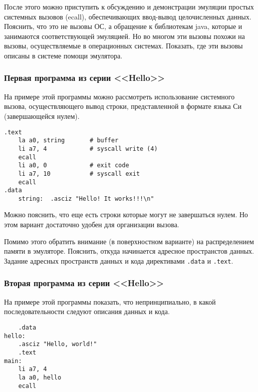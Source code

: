
После этого можно приступить к обсуждению и демонстрации эмуляции простых системных вызовов (ecall), обеспечивающих ввод-вывод целочисленных данных. Пояснить, что это не вызовы ОС, а обращение к библиотекам java, которые и занимаются соответствующей эмуляцией. Но во многом эти вызовы похожи на вызовы, осуществляемые в операционных системах. Показать, где эти вызовы описаны в системе помощи эмулятора.

\subsubsection{Первая программа из серии <<Hello>>}
На примере этой программы можно рассмотреть использование системного вызова, осуществляющего вывод строки, представленной в формате языка Си (завершающейся нулем).
\begin{verbatim}
.text
    la a0, string       # buffer
    li a7, 4            # syscall write (4)
    ecall
    li a0, 0            # exit code
    li a7, 10           # syscall exit
    ecall
.data
    string:  .asciz "Hello! It works!!!\n"
\end{verbatim}
Можно пояснить, что еще есть строки которые могут не завершаться нулем. Но этом вариант достаточно удобен для организации вызова.

Помимо этого обратить внимание (в поверхностном варианте) на распределением памяти в эмуляторе. Пояснить, откуда начинается адресное пространстов данных. Задание адресных пространств данных и кода директивами \verb|.data|  и \verb|.text|.

\subsubsection{Вторая программа из серии <<Hello>>}
На примере этой программы показать, что непринципиально, в какой последовательности следуют описания данных и кода.

\begin{verbatim}
    .data
hello:
    .asciz "Hello, world!"
    .text
main:
    li a7, 4
    la a0, hello
    ecall
\end{verbatim}

